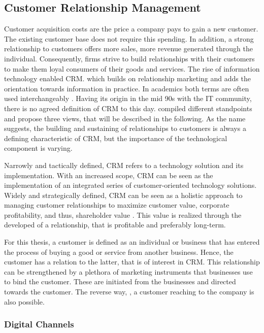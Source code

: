 		\subsection{Customer Relationship Management}
		Customer acquisition costs are the price a company pays to gain a new customer. The existing customer base does not require this spending. In addition, a strong relationship to customers offers more sales, \ie more revenue generated through the individual. Consequently, firms strive to build relationships with their customers to make them loyal consumers of their goods and services. The rise of information technology enabled \acrfull{CRM}. which builds on relationship marketing and adds the orientation towards information in practice. In academics both terms are often used interchangeably \cite{ryals2001customer}.  Having its origin in the mid 90s with the IT community, there is no agreed definition of	\acrshort{CRM} to this day. \cite{paynefrow2005} compiled different standpoints and propose three views, that will be described in the following. As the name suggests, the building and sustaining of relationships to customers is always a defining characteristic of \acrshort{CRM}, but the importance of the technological component is varying. 
		
		Narrowly and tactically defined, \acrshort{CRM} refers to a technology solution and its implementation. With an increased scope, \acrshort{CRM} can be seen as the implementation of an integrated series of customer-oriented technology solutions. Widely and strategically defined, \acrshort{CRM} can be seen as a holistic approach to managing customer relationships to maximize customer value, corporate profitability, and thus, shareholder value \cite{payne2004role}. This value is realized through the developed of a relationship, that is profitable and preferably long-term. 
	
		For this thesis, a customer is defined as an individual or business that has entered the process of buying a good or service from another business. Hence, the customer has a relation to the latter, that is of interest in CRM. This relationship can be strengthened by a plethora of marketing instruments that businesses use to bind the customer. These are initiated from the businesses and directed towards the customer. The reverse way, \ie, a customer reaching to the company is also possible.  
		\subsubsection{Digital Channels}
